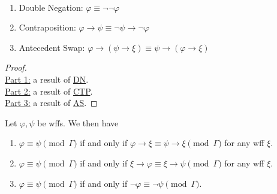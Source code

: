 \documentclass{treatise}
\begin{document}
\begin{example} \label{prev-res-log-equiv} \ 
\begin{enumerate}
    \item Double Negation: $\varphi \equiv \neg \neg \varphi$
    \item Contraposition: $\varphi \to \psi \equiv \neg \psi \to \neg \varphi$
    \item Antecedent Swap: $\varphi \to (\psi \to \xi) \equiv \psi \to (\varphi \to \xi)$
\end{enumerate}
\end{example}
\begin{proof} \ \\
\underline{Part 1:} a result of \hyperref[HPL-T-DN]{DN}.
\\
\underline{Part 2:} a result of \hyperref[HPL-T-CTP]{CTP}.
\\
\underline{Part 3:} a result of \hyperref[HPL-T-AS]{AS}.
\end{proof}
\begin{theorem} \label{HPL-R-LS}
Let $\varphi, \psi$ be wffs. We then have
\begin{enumerate}
    \item $\varphi \equiv \psi \pmod{\Gamma}$ if and only if $\varphi \to \xi \equiv \psi \to \xi \pmod{\Gamma}$ for any wff $\xi$.
    \item $\varphi \equiv \psi \pmod{\Gamma}$ if and only if $\xi \to \varphi \equiv \xi \to \psi \pmod{\Gamma}$ for any wff $\xi$.
    \item $\varphi \equiv \psi \pmod{\Gamma}$ if and only if $\neg \varphi \equiv \neg \psi \pmod{\Gamma}$.
\end{enumerate}
\end{theorem}
\end{document}
